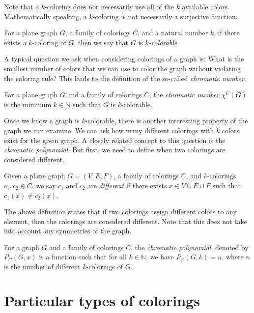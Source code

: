 Note that a $k$-coloring does not necessarily use all of the $k$ available colors. Mathematically speaking, a $k$-coloring is not necessarily a surjective function.

\begin{defn}
    For a plane graph $G$, a family of colorings $C$, and a natural number $k$, if there exists a $k$-coloring of $G$, then we say that $G$ is \emph{$k$-colorable}.
\end{defn}

A typical question we ask when considering colorings of a graph is: What is the smallest number of colors that we can use to color the graph without violating the coloring rule? This leads to the definition of the so-called \textit{chromatic number}.


\begin{defn}
    For a plane graph $G$ and a family of colorings $C$, the \emph{chromatic number} $\chi^C(G)$ is the minimum $k \in \mathbb{N}$ such that $G$ is $k$-colorable.
\end{defn}

Once we know a graph is $k$-colorable, there is another interesting property of the graph we can examine. We can ask how many different colorings with $k$ colors exist for the given graph. A closely related concept to this question is the \emph{chromatic polynomial}. But first, we need to define when two colorings are considered different.

\begin{defn}
    Given a plane graph $G = (V, E, F)$, a family of colorings $C$, and $k$-colorings $c_1, c_2 \in C$, we say $c_1$ and $c_2$ are \emph{different} if there exists $x \in V \cup E \cup F$ such that $c_1(x) \neq c_2(x)$.
\end{defn}

The above definition states that if two colorings assign different colors to any element, then the colorings are considered different. Note that this does not take into account any symmetries of the graph.

\begin{defn}
    For a graph $G$ and a family of colorings $C$, the \emph{chromatic polynomial}, denoted by $P_C(G,x)$ is a function such that for all $k \in \mathbb{N}$, we have $P_C(G,k) = n$, where $n$ is the number of different $k$-colorings of $G$.
\end{defn}

\section{Particular types of colorings}

